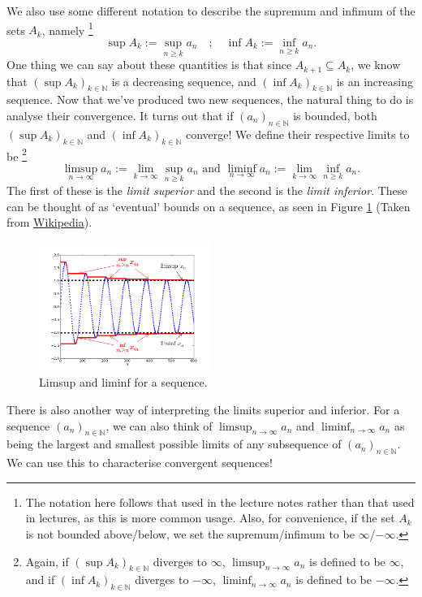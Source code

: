 \documentclass[
  12pt,
  a4paper]{extarticle}
\theoremstyle{plain}
\theoremstyle{definition}
\theoremstyle{plain}
\theoremstyle{plain}
\theoremstyle{plain}
\theoremstyle{plain}
\theoremstyle{definition}
\theoremstyle{definition}
\theoremstyle{remark}
\theoremstyle{remark}
\renewcommand{\;}{\,}
\begin{document}
We also use some different notation to describe the supremum and infimum of the sets \(A_k\), namely \footnote{The notation here follows that used in the lecture notes rather than that used in lectures, as this is more common usage. Also, for convenience, if the set \(A_k\) is not bounded above/below, we set the supremum/infimum to be \(\infty\)/\(-\infty\).} \[\sup A_k := \sup_{n\geq k}a_n \quad ; \quad \inf A_k := \inf_{n \geq k}a_n.\] One thing we can say about these quantities is that since \(A_{k+1} \subseteq A_k\), we know that \((\sup A_k)_{k\in\mathbb{N}}\) is a decreasing sequence, and \((\inf A_k)_{k\in\mathbb{N}}\) is an increasing sequence. Now that we've produced two new sequences, the natural thing to do is analyse their convergence. It turns out that if \((a_n)_{n\in\mathbb{N}}\) is bounded, both \((\sup A_k)_{k\in\mathbb{N}}\) and \((\inf A_k)_{k\in\mathbb{N}}\) converge! We define their respective limits to be \footnote{Again, if \((\sup A_k)_{k\in\mathbb{N}}\) diverges to \(\infty\), \(\limsup_{n \to \infty} a_n\) is defined to be \(\infty\), and if \((\inf A_k)_{k\in\mathbb{N}}\) diverges to \(-\infty\), \(\liminf_{n \to \infty} a_n\) is defined to be \(-\infty\).} \[\limsup_{n \to \infty} a_n := \lim_{k\to\infty}\sup_{n\geq k}a_n \;\, \text{and} \;\, \liminf_{n \to \infty} a_n := \lim_{k\to\infty}\inf_{n\geq k}a_n.\] The first of these is the \emph{limit superior} and the second is the \emph{limit inferior}. These can be thought of as `eventual' bounds on a sequence, as seen in Figure \ref{fig:limsup} (Taken from \href{https://en.wikipedia.org/wiki/Limit_inferior_and_limit_superior}{Wikipedia}).

\begin{figure}
\centering
\includegraphics[width=0.5\textwidth,height=\textheight]{Lim_sup_example_5.png}
\caption{\label{fig:limsup} Limsup and liminf for a sequence.}
\end{figure}

There is also another way of interpreting the limits superior and inferior. For a sequence \((a_n)_{n\in\mathbb{N}}\), we can also think of \(\limsup_{n\to\infty} a_n\) and \(\liminf_{n \to \infty}a_n\) as being the largest and smallest possible limits of any subsequence of \((a_n)_{n\in\mathbb{N}}\). We can use this to characterise convergent sequences!
\end{document}
